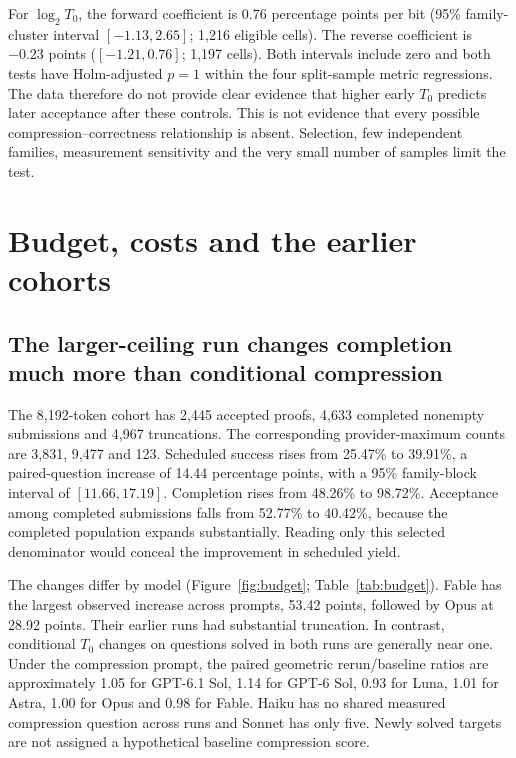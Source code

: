 \documentclass[11pt]{article}
\begin{document}
For $\log_2 T_0$, the forward coefficient is 0.76 percentage points per bit (95\% family-cluster interval $[-1.13,2.65]$; 1,216 eligible cells). The reverse coefficient is $-0.23$ points ($[-1.21,0.76]$; 1,197 cells). Both intervals include zero and both tests have Holm-adjusted $p=1$ within the four split-sample metric regressions. The data therefore do not provide clear evidence that higher early $T_0$ predicts later acceptance after these controls. This is not evidence that every possible compression--correctness relationship is absent. Selection, few independent families, measurement sensitivity and the very small number of samples limit the test.

\FloatBarrier
\section{Budget, costs and the earlier cohorts}
\label{sec:budget}
\subsection{The larger-ceiling run changes completion much more than conditional compression}
The 8,192-token cohort has 2,445 accepted proofs, 4,633 completed nonempty submissions and 4,967 truncations. The corresponding provider-maximum counts are 3,831, 9,477 and 123. Scheduled success rises from 25.47\% to 39.91\%, a paired-question increase of 14.44 percentage points, with a 95\% family-block interval of $[11.66,17.19]$. Completion rises from 48.26\% to 98.72\%. Acceptance among completed submissions falls from 52.77\% to 40.42\%, because the completed population expands substantially. Reading only this selected denominator would conceal the improvement in scheduled yield.

The changes differ by model (Figure~\ref{fig:budget}; Table~\ref{tab:budget}). Fable has the largest observed increase across prompts, 53.42 points, followed by Opus at 28.92 points. Their earlier runs had substantial truncation. In contrast, conditional $T_0$ changes on questions solved in both runs are generally near one. Under the compression prompt, the paired geometric rerun/baseline ratios are approximately 1.05 for GPT-6.1 Sol, 1.14 for GPT-6 Sol, 0.93 for Luna, 1.01 for Astra, 1.00 for Opus and 0.98 for Fable. Haiku has no shared measured compression question across runs and Sonnet has only five. Newly solved targets are not assigned a hypothetical baseline compression score.
\end{document}
